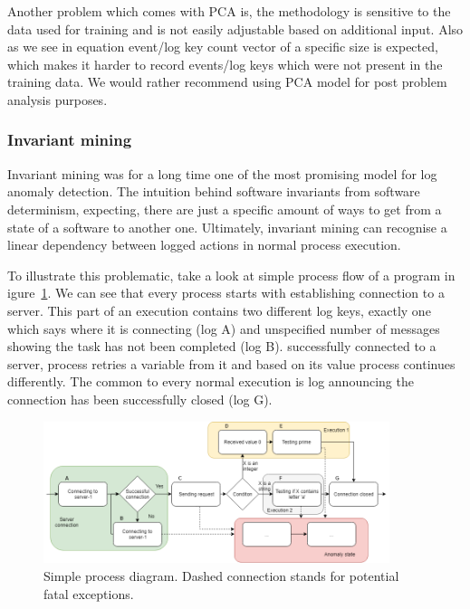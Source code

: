 Another problem which comes with PCA is, the methodology is sensitive to the data used for training and is not easily adjustable based on additional input. Also as we see in equation \ms{(\ref{eq:sota_adetect_pca})} event/log key count vector of a specific size is expected, which makes it harder to record events/log keys which were not present in the training data. We would rather recommend using PCA model for post problem analysis purposes.

\subsubsection{Invariant mining}

Invariant mining was for a long time one of the most promising model for log anomaly detection. The intuition behind software invariants  from software determinism, expecting, there are just a specific amount of ways to get from a state of a software to another one. Ultimately, invariant mining can recognise a linear dependency between logged actions in normal process execution.

To illustrate this problematic, take a look at simple process flow of a program in igure~\ref{fig:sota_invMining_simpleProcess}. We can see that every process starts with establishing connection to a server. This part of an execution contains two different log keys, exactly one which says where it is connecting (log A) and unspecified number of messages showing the task has not been completed (log B).  successfully connected to a server, process retries a variable from it and based on its value process continues differently. The common to every normal execution is log announcing the connection has been successfully closed (log G).

\begin{figure}[h]
    \centering
    \includegraphics[width=0.9\textwidth]{figures/stateOfTheArt/simpleProcessWorkflow.png}
    \caption{Simple process diagram. Dashed connection stands for potential fatal exceptions.}
    \label{fig:sota_invMining_simpleProcess}
\end{figure}

